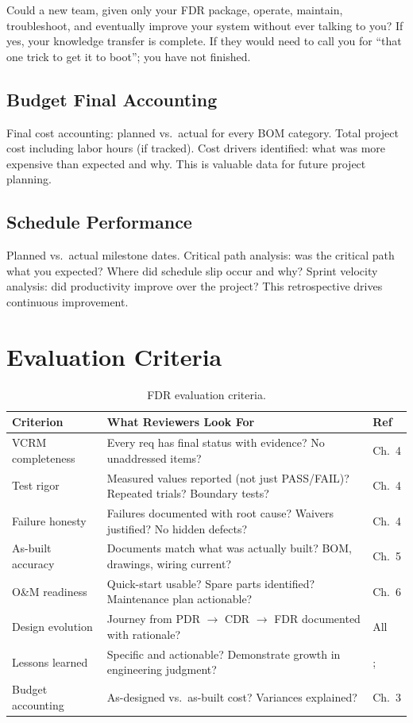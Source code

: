 \documentclass[11pt,letterpaper,twoside,openany]{book}
\begin{document}
\begin{tipbox}
Could a new team, given only your FDR package, operate, maintain, troubleshoot, and eventually improve your system without ever talking to you? If yes, your knowledge transfer is complete. If they would need to call you for ``that one trick to get it to boot''; you have not finished.
\end{tipbox}


\subsection{Budget Final Accounting}
Final cost accounting: planned vs.\ actual for every BOM category. Total project cost including labor hours (if tracked). Cost drivers identified: what was more expensive than expected and why. This is valuable data for future project planning.

\subsection{Schedule Performance}
Planned vs.\ actual milestone dates. Critical path analysis: was the critical path what you expected? Where did schedule slip occur and why? Sprint velocity analysis: did productivity improve over the project? This retrospective drives continuous improvement.


\section{Evaluation Criteria}

\begin{table}[htbp]\centering\small
\begin{tabularx}{\textwidth}{l X l}
\toprule
\textbf{Criterion} & \textbf{What Reviewers Look For} & \textbf{Ref} \\
\midrule
VCRM completeness & Every req has final status with evidence? No unaddressed items? & Ch.~4 \\
Test rigor & Measured values reported (not just PASS/FAIL)? Repeated trials? Boundary tests? & Ch.~4 \\
Failure honesty & Failures documented with root cause? Waivers justified? No hidden defects? & Ch.~4 \\
As-built accuracy & Documents match what was actually built? BOM, drawings, wiring current? & Ch.~5 \\
O\&M readiness & Quick-start usable? Spare parts identified? Maintenance plan actionable? & Ch.~6 \\
Design evolution & Journey from PDR $\to$ CDR $\to$ FDR documented with rationale? & All \\
Lessons learned & Specific and actionable? Demonstrate growth in engineering judgment? &; \\
Budget accounting & As-designed vs.\ as-built cost? Variances explained? & Ch.~3 \\
\bottomrule
\end{tabularx}
\caption{FDR evaluation criteria.}
\end{table}
\end{document}
